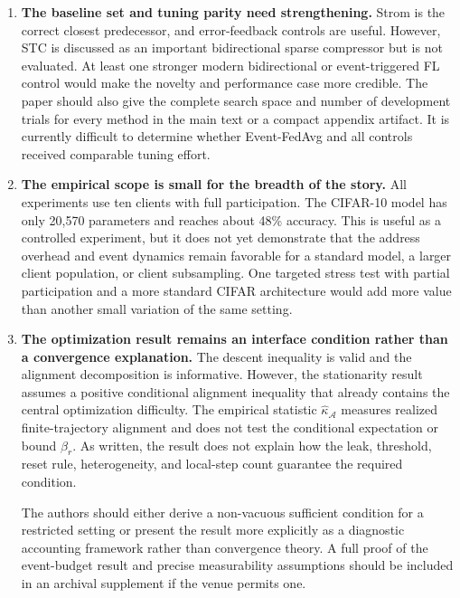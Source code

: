\documentclass[10pt]{article}
\begin{document}
\begin{enumerate}
  \item \textbf{The baseline set and tuning parity need strengthening.}
  Strom is the correct closest predecessor, and error-feedback controls are
  useful. However, STC is discussed as an important bidirectional sparse
  compressor but is not evaluated. At least one stronger modern
  bidirectional or event-triggered FL control would make the novelty and
  performance case more credible. The paper should also give the complete
  search space and number of development trials for every method in the main
  text or a compact appendix artifact. It is currently difficult to determine
  whether Event-FedAvg and all controls received comparable tuning effort.

  \item \textbf{The empirical scope is small for the breadth of the story.}
  All experiments use ten clients with full participation. The CIFAR-10 model
  has only 20,570 parameters and reaches about 48\% accuracy. This is useful as
  a controlled experiment, but it does not yet demonstrate that the address
  overhead and event dynamics remain favorable for a standard model, a larger
  client population, or client subsampling. One targeted stress test with
  partial participation and a more standard CIFAR architecture would add more
  value than another small variation of the same setting.

  \item \textbf{The optimization result remains an interface condition rather
  than a convergence explanation.}
  The descent inequality is valid and the alignment decomposition is
  informative. However, the stationarity result assumes a positive conditional
  alignment inequality that already contains the central optimization
  difficulty. The empirical statistic $\widehat{\kappa}_{\mathcal A}$ measures
  realized finite-trajectory alignment and does not test the conditional
  expectation or bound $\beta_r$. As written, the result does not explain how
  the leak, threshold, reset rule, heterogeneity, and local-step count guarantee
  the required condition.

  The authors should either derive a non-vacuous sufficient condition for a
  restricted setting or present the result more explicitly as a diagnostic
  accounting framework rather than convergence theory. A full proof of the
  event-budget result and precise measurability assumptions should be included
  in an archival supplement if the venue permits one.
\end{enumerate}
\end{document}
